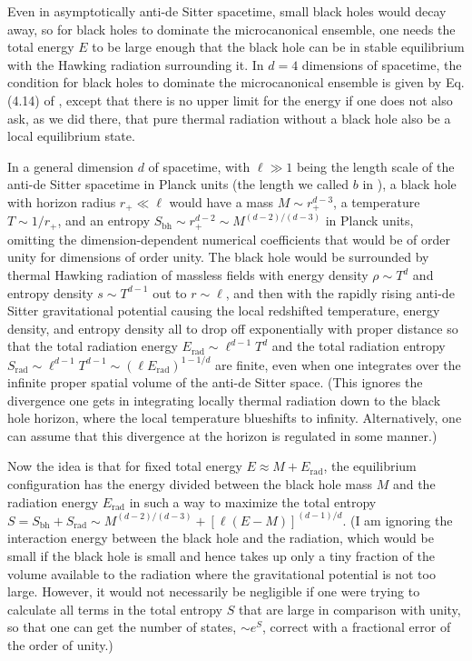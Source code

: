 \documentclass[12pt]{article} \usepackage{latexsym}
\begin{document}
Even in asymptotically anti-de Sitter spacetime, small black holes would
decay away, so for black holes to dominate the microcanonical ensemble,
one needs the total energy $E$ to be large enough that the black hole
can be in stable equilibrium with the Hawking radiation surrounding
it.  In $d=4$ dimensions of spacetime, the condition for black holes to
dominate the microcanonical ensemble is given by Eq. (4.14) of
\cite{HawPage}, except that there is no upper limit for the energy if
one does not also ask, as we did there, that pure thermal radiation
without a black hole also be a local equilibrium state.

In a general dimension $d$ of spacetime, with $\ell \gg 1$ being the
length scale of the anti-de Sitter spacetime in Planck units (the length
we called $b$ in \cite{HawPage}), a black hole with horizon radius $r_+
\ll \ell$ would have a mass $M \sim r_+^{d-3}$, a temperature $T \sim
1/r_+$, and an entropy $S_{\mathrm{bh}} \sim r_+^{d-2} \sim
M^{(d-2)/(d-3)}$ in Planck units, omitting the dimension-dependent
numerical coefficients that would be of order unity for dimensions of
order unity.  The black hole would be surrounded by thermal Hawking
radiation of massless fields with energy density $\rho \sim T^d$ and
entropy density $s \sim T^{d-1}$ out to $r \sim \ell$, and then with
the rapidly rising anti-de Sitter gravitational potential causing the
local redshifted temperature, energy density, and entropy density all
to drop off exponentially with proper distance so that the total
radiation energy $E_{\mathrm{rad}} \sim \ell^{d-1} T^d$ and the total
radiation entropy $S_{\mathrm{rad}} \sim \ell^{d-1} T^{d-1} \sim (\ell
E_{\mathrm{rad}})^{1-1/d}$ are finite, even when one integrates over
the infinite proper spatial volume of the anti-de Sitter space.  (This
ignores the divergence one gets in integrating locally thermal
radiation down to the black hole horizon, where the local temperature
blueshifts to infinity.  Alternatively, one can assume that this
divergence at the horizon is regulated in some manner.)

Now the idea \cite{Haw3,PagGRG,HawPage} is that for fixed total energy
$E \approx M + E_{\mathrm{rad}}$, the equilibrium configuration has the
energy divided between the black hole mass $M$ and the radiation energy
$E_{\mathrm{rad}}$ in such a way to maximize the total entropy $S =
S_{\mathrm{bh}} + S_{\mathrm{rad}} \sim M^{(d-2)/(d-3)} +
[\ell(E-M)]^{(d-1)/d}$.  (I am ignoring the interaction energy between
the black hole and the radiation, which would be small if the black
hole is small and hence takes up only a tiny fraction of the volume
available to the radiation where the gravitational potential is not too
large.  However, it would not necessarily be negligible if one were
trying to calculate all terms in the total entropy $S$ that are large
in comparison with unity, so that one can get the number of states,
$\sim e^S$, correct with a fractional error of the order of unity.) 
\end{document}

